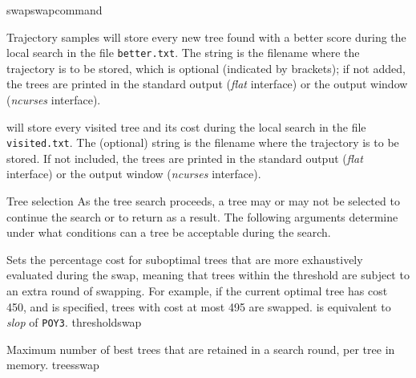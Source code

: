 \begin{command}{swap}{swapcommand}
\begin{arguments}
\begin{argumentgroup}{Trajectory samples}
		    { will store every new tree
                found with a better score during the local search in the file
                \texttt{better.txt}. The string is the filename where the
                trajectory is to be stored, which is optional (indicated by
                brackets); if not added, the trees are printed in the standard
                output (\emph{flat} interface) or the output window (\emph{ncurses} 
                interface).}
                {} 

            { will store every visited tree
            and its cost during the local search in the file
            \texttt{visited.txt}. The (optional) string is the filename where the
            trajectory is to be stored. If not included, the trees are printed
            in the standard output (\emph{flat} interface) or the output window (\emph{ncurses}
            interface).}
            {}
    
    \end{argumentgroup}
            
        \begin{argumentgroup}{Tree selection}
            {As the tree search proceeds, a tree may or may not be selected to
            continue the search or to return as a result. The following
            arguments determine under what conditions can a tree be acceptable
            during the search.}

                {Sets the percentage cost for suboptimal
                trees that are more exhaustively evaluated during the swap,
                meaning that trees within the threshold are subject to an extra
                round of swapping. For example, if the current
                optimal tree has cost 450, and  is specified, trees
                with cost at most 495 are swapped.   is
                equivalent to \emph{slop} of  \texttt{POY3}.}
                {thresholdswap}

                {Maximum number of best trees that are retained in a search round,
                per tree in memory.}
                {treesswap}

        \end{argumentgroup}
    

\end{arguments}
\end{command}
